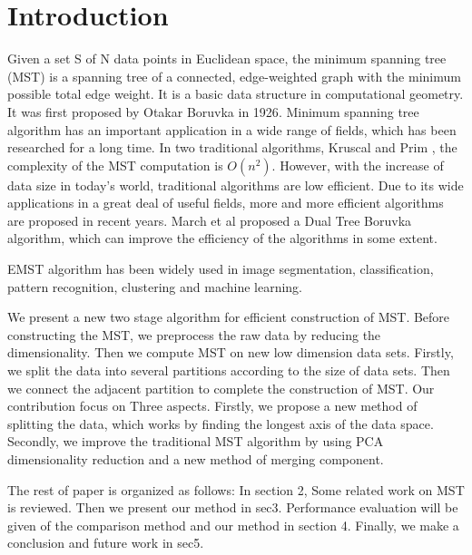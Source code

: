 \section{Introduction}
Given a set S of N data points in Euclidean space, the minimum spanning tree (MST) is a spanning tree of a connected, edge-weighted graph with the minimum possible total edge weight. It is a basic data structure in computational geometry. It was first proposed by Otakar Boruvka in 1926\cite{zbMATH02560699}. Minimum spanning tree algorithm has an important application in a wide range of fields, which has been researched for a long time. In two traditional algorithms, Kruscal\cite{Kruskal1956On} and Prim \cite{Prim2013Shortest}, the complexity of the MST computation is $O(n^2)$. However, with the increase of data size in today's world, traditional algorithms are low efficient. Due to its wide applications in a great deal of useful fields, more and more efficient algorithms are proposed in recent years. March et al proposed a Dual Tree Boruvka algorithm, which can improve the efficiency of the algorithms in some extent.

EMST algorithm has been widely used in image segmentation\cite{An2000A, Xu19972D}, classification\cite{Juszczak2009Minimum}, pattern recognition\cite{Zhong2010A}, clustering\cite{Zahn1971Graph, Xu2002Clustering} and machine learning.

We present a new two stage algorithm for efficient construction of MST. Before constructing the MST, we preprocess the raw data by reducing the dimensionality. Then we compute MST on new low dimension data sets. Firstly, we split the data into several partitions according to the size of data sets. Then we connect the adjacent partition to complete the construction of MST. Our contribution focus on Three aspects. Firstly, we propose a new method of splitting the data, which works by finding the longest axis of the data space. Secondly, we improve the traditional MST algorithm by using PCA dimensionality reduction and a new method of merging component. 

The rest of paper is organized as follows: In section 2, Some related work on MST is reviewed. Then we present our method in sec3. Performance evaluation will be given of the comparison method and our method in section 4. Finally, we make a conclusion and future work in sec5.
 
